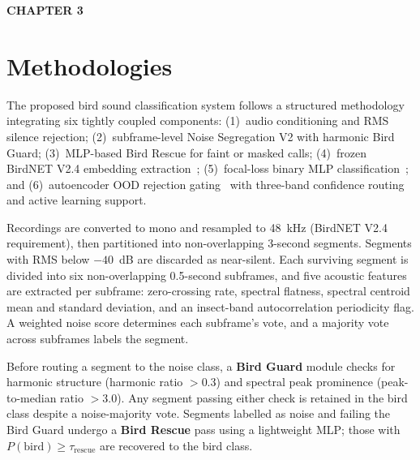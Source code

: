 \documentclass[a4paper,12pt]{article}
\begin{document}
\newpage
\thispagestyle{plain}

\begin{center}
{\fontsize{18}{20}\bfseries CHAPTER 3}
\end{center}


\vspace{0.5cm}

\setcounter{section}{0}
\renewcommand{\thesection}{3.\arabic{section}}

\section{Methodologies}

\noindent
The proposed bird sound classification system follows a structured methodology integrating six tightly
coupled components: (1)~audio conditioning and RMS silence rejection; (2)~subframe-level Noise
Segregation V2 with harmonic Bird Guard; (3)~MLP-based Bird Rescue for faint or masked calls;
(4)~frozen BirdNET V2.4 embedding extraction~\cite{BirdNET}; (5)~focal-loss binary MLP
classification~\cite{FocalLoss}; and (6)~autoencoder OOD rejection gating~\cite{Ntalampiras,Hinton}
with three-band confidence routing and active learning support.

\vspace{0.3cm}

\noindent
Recordings are converted to mono and resampled to 48~kHz (BirdNET V2.4 requirement), then
partitioned into non-overlapping 3-second segments. Segments with RMS below $-40$~dB are discarded
as near-silent. Each surviving segment is divided into six non-overlapping 0.5-second subframes,
and five acoustic features are extracted per subframe: zero-crossing rate, spectral flatness,
spectral centroid mean and standard deviation, and an insect-band autocorrelation periodicity
flag. A weighted noise score determines each subframe's vote, and a majority vote across subframes
labels the segment.

\vspace{0.3cm}

\noindent
Before routing a segment to the noise class, a \textbf{Bird Guard} module checks for harmonic
structure (harmonic ratio $> 0.3$) and spectral peak prominence (peak-to-median ratio $> 3.0$).
Any segment passing either check is retained in the bird class despite a noise-majority vote.
Segments labelled as noise and failing the Bird Guard undergo a \textbf{Bird Rescue} pass using
a lightweight MLP; those with $P(\mathrm{bird}) \geq \tau_{\mathrm{rescue}}$ are recovered
to the bird class.
\end{document}

